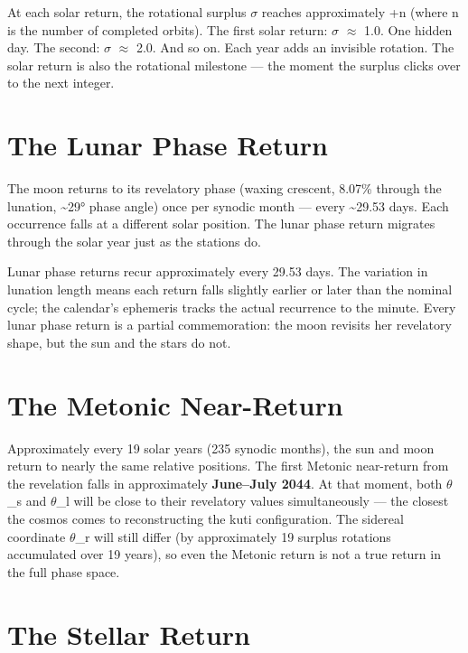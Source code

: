 At each solar return, the rotational surplus \(\sigma\) reaches approximately +n (where n is the number of completed orbits). The first solar return: \(\sigma\) \(\approx\) 1.0. One hidden day. The second: \(\sigma\) \(\approx\) 2.0. And so on. Each year adds an invisible rotation. The solar return is also the rotational milestone --- the moment the surplus clicks over to the next integer.

\hypertarget{the-lunar-phase-return}{%
\section{The Lunar Phase Return}\label{the-lunar-phase-return}}

The moon returns to its revelatory phase (waxing crescent, 8.07\% through the lunation, \textasciitilde29° phase angle) once per synodic month --- every \textasciitilde29.53 days. Each occurrence falls at a different solar position. The lunar phase return migrates through the solar year just as the stations do.

Lunar phase returns recur approximately every 29.53 days. The variation in lunation length means each return falls slightly earlier or later than the nominal cycle; the calendar's ephemeris tracks the actual recurrence to the minute. Every lunar phase return is a partial commemoration: the moon revisits her revelatory shape, but the sun and the stars do not.

\hypertarget{the-metonic-near-return}{%
\section{The Metonic Near-Return}\label{the-metonic-near-return}}

Approximately every 19 solar years (235 synodic months), the sun and moon return to nearly the same relative positions. The first Metonic near-return from the revelation falls in approximately \textbf{June--July 2044}. At that moment, both \(\theta\)\_s and \(\theta\)\_l will be close to their revelatory values simultaneously --- the closest the cosmos comes to reconstructing the kuti configuration. The sidereal coordinate \(\theta\)\_r will still differ (by approximately 19 surplus rotations accumulated over 19 years), so even the Metonic return is not a true return in the full phase space.

\hypertarget{the-stellar-return}{%
\section{The Stellar Return}\label{the-stellar-return}}

